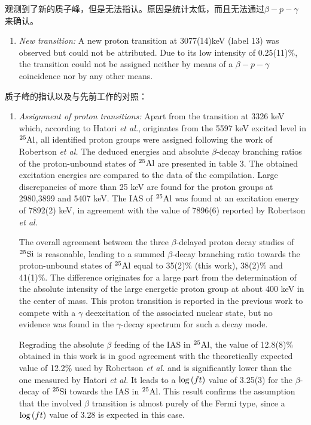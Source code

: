 \documentclass[a4paper]{article}
\begin{document}
观测到了新的质子峰，但是无法指认。原因是统计太低，而且无法通过$\beta -p-\gamma $来确认。
\begin{enumerate}
    \item \textit{New transition:} A new proton transition at 3077(14)keV (label 13) was observed but could not be attributed. Due to its low intensity of 0.25(11)\%, the transition could not be assigned neither by means of a $\beta-p-\gamma $ coincidence nor by any other means.
\end{enumerate}

质子峰的指认以及与先前工作的对照：
\begin{enumerate}
    \item \textit{Assignment of proton transitions:} Apart from the transition at 3326 keV which, according to Hatori \textit{et al.}, originates from the 5597 keV excited level in $^{25}\textnormal{Al}$, all identified proton groups were assigned following the work of Robertson \textit{et al.} The deduced energies and absolute $\beta$-decay branching ratios of the proton-unbound states of $^{25}\textnormal{Al}$ are presented in table 3. The obtained excitation energies are compared to the data of the compilation. Large discrepancies of more than 25 keV are found for the proton groups at 2980,3899 and 5407 keV. The IAS of $^{25}\textnormal{Al}$ was found at an excitation energy of 7892(2) keV, in agreement with the value of 7896(6) reported by Robertson \textit{et al.} 
    
    The overall agreement between the three $\beta$-delayed proton decay studies of $^{25}\textnormal{Si}$ is reasonable, leading to a summed $\beta$-decay branching ratio towards the proton-unbound states of $^{25}\textnormal{Al}$ equal to 35(2)\% (this work), 38(2)\% and 41(1)\%. The difference originates for a large part from the determination of the absolute intensity of the large energetic proton group at about 400 keV in the center of mass. This proton transition is reported in the previous work to compete with a $\gamma$ deexcitation of the associated nuclear state, but no evidence was found in the $\gamma$-decay spectrum for such a decay mode.

    Regrading the absolute $\beta$ feeding of the IAS in $^{25}\textnormal{Al}$, the value of 12.8(8)\% obtained in this work is in good agreement with the theoretically expected value of 12.2\% used by Robertson \textit{et al.} and is significantly lower than the one measured by Hatori \textit{et al.} It leads to a $\textnormal{log}\left( ft \right)$ value of 3.25(3) for the $\beta$-decay of $^{25}\textnormal{Si}$ towards the IAS in $^{25}\textnormal{Al}$. This result confirms the assumption that the involved $\beta$ transition is almost purely of the Fermi type, since a $\textnormal{log}\left( ft \right)$ value of 3.28 is expected in this case.
\end{enumerate}
\end{document}
